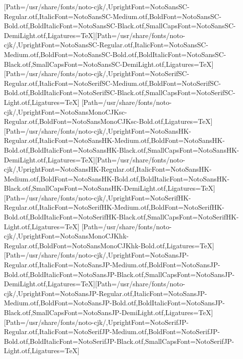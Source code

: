 \newfontfamily{}[Path=/usr/share/fonts/noto-cjk/,UprightFont=NotoSansSC-Regular.otf,ItalicFont=NotoSansSC-Medium.otf,BoldFont=NotoSansSC-Bold.otf,BoldItalicFont=NotoSansSC-Black.otf,SmallCapsFont=NotoSansSC-DemiLight.otf,Ligatures=TeX]\newfontfamily{}[Path=/usr/share/fonts/noto-cjk/,UprightFont=NotoSansSC-Regular.otf,ItalicFont=NotoSansSC-Medium.otf,BoldFont=NotoSansSC-Bold.otf,BoldItalicFont=NotoSansSC-Black.otf,SmallCapsFont=NotoSansSC-DemiLight.otf,Ligatures=TeX]
\newfontfamily{}[Path=/usr/share/fonts/noto-cjk/,UprightFont=NotoSerifSC-Regular.otf,ItalicFont=NotoSerifSC-Medium.otf,BoldFont=NotoSerifSC-Bold.otf,BoldItalicFont=NotoSerifSC-Black.otf,SmallCapsFont=NotoSerifSC-Light.otf,Ligatures=TeX]
\newfontfamily{}[Path=/usr/share/fonts/noto-cjk/,UprightFont=NotoSansMonoCJKsc-Regular.otf,BoldFont=NotoSansMonoCJKsc-Bold.otf,Ligatures=TeX]
\newfontfamily{}[Path=/usr/share/fonts/noto-cjk/,UprightFont=NotoSansHK-Regular.otf,ItalicFont=NotoSansHK-Medium.otf,BoldFont=NotoSansHK-Bold.otf,BoldItalicFont=NotoSansHK-Black.otf,SmallCapsFont=NotoSansHK-DemiLight.otf,Ligatures=TeX]\newfontfamily{}[Path=/usr/share/fonts/noto-cjk/,UprightFont=NotoSansHK-Regular.otf,ItalicFont=NotoSansHK-Medium.otf,BoldFont=NotoSansHK-Bold.otf,BoldItalicFont=NotoSansHK-Black.otf,SmallCapsFont=NotoSansHK-DemiLight.otf,Ligatures=TeX]
\newfontfamily{}[Path=/usr/share/fonts/noto-cjk/,UprightFont=NotoSerifHK-Regular.otf,ItalicFont=NotoSerifHK-Medium.otf,BoldFont=NotoSerifHK-Bold.otf,BoldItalicFont=NotoSerifHK-Black.otf,SmallCapsFont=NotoSerifHK-Light.otf,Ligatures=TeX]
\newfontfamily{}[Path=/usr/share/fonts/noto-cjk/,UprightFont=NotoSansMonoCJKhk-Regular.otf,BoldFont=NotoSansMonoCJKhk-Bold.otf,Ligatures=TeX]
\newfontfamily{}[Path=/usr/share/fonts/noto-cjk/,UprightFont=NotoSansJP-Regular.otf,ItalicFont=NotoSansJP-Medium.otf,BoldFont=NotoSansJP-Bold.otf,BoldItalicFont=NotoSansJP-Black.otf,SmallCapsFont=NotoSansJP-DemiLight.otf,Ligatures=TeX]\newfontfamily{}[Path=/usr/share/fonts/noto-cjk/,UprightFont=NotoSansJP-Regular.otf,ItalicFont=NotoSansJP-Medium.otf,BoldFont=NotoSansJP-Bold.otf,BoldItalicFont=NotoSansJP-Black.otf,SmallCapsFont=NotoSansJP-DemiLight.otf,Ligatures=TeX]
\newfontfamily{}[Path=/usr/share/fonts/noto-cjk/,UprightFont=NotoSerifJP-Regular.otf,ItalicFont=NotoSerifJP-Medium.otf,BoldFont=NotoSerifJP-Bold.otf,BoldItalicFont=NotoSerifJP-Black.otf,SmallCapsFont=NotoSerifJP-Light.otf,Ligatures=TeX]

